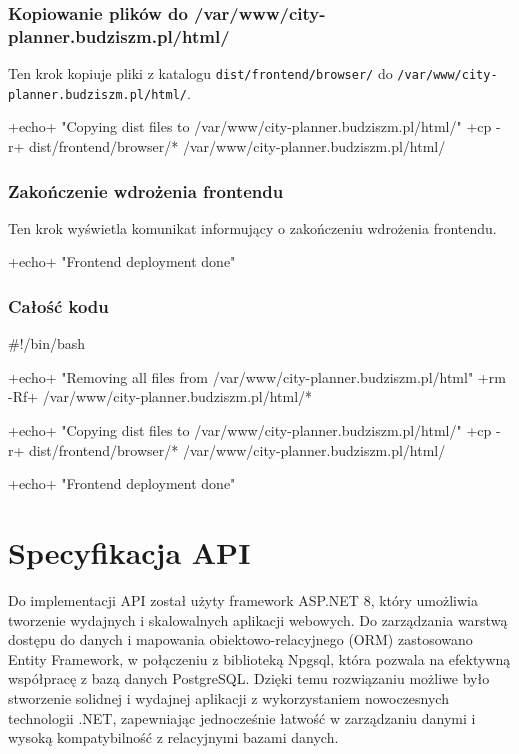 \subsubsection{Kopiowanie plików do /var/www/city-planner.budziszm.pl/html/}
Ten krok kopiuje pliki z katalogu \texttt{dist/frontend/browser/} \newline
do \texttt{/var/www/city-planner.budziszm.pl/html/}.
\begin{longlisting}[style=shell-colored]
+echo+ "Copying dist files to /var/www/city-planner.budziszm.pl/html/"
+cp -r+ dist/frontend/browser/* /var/www/city-planner.budziszm.pl/html/
\end{longlisting}

\subsubsection{Zakończenie wdrożenia frontendu}
Ten krok wyświetla komunikat informujący o zakończeniu wdrożenia frontendu.
\begin{longlisting}[style=shell-colored]
+echo+ "Frontend deployment done"
\end{longlisting}

\subsubsection{Całość kodu}
\begin{longlisting}[style=shell-colored]
#!/bin/bash

+echo+ "Removing all files from /var/www/city-planner.budziszm.pl/html"
+rm -Rf+ /var/www/city-planner.budziszm.pl/html/*

+echo+ "Copying dist files to /var/www/city-planner.budziszm.pl/html/"
+cp -r+ dist/frontend/browser/* /var/www/city-planner.budziszm.pl/html/

+echo+ "Frontend deployment done"
\end{longlisting}

\section{Specyfikacja API}
Do implementacji API został użyty framework ASP.NET 8, który umożliwia tworzenie wydajnych i skalowalnych aplikacji webowych. Do zarządzania warstwą dostępu do danych i mapowania obiektowo-relacyjnego (ORM) zastosowano Entity Framework, w połączeniu z biblioteką Npgsql, która pozwala na efektywną współpracę z bazą danych PostgreSQL\@.
Dzięki temu rozwiązaniu możliwe było stworzenie solidnej i wydajnej aplikacji z wykorzystaniem nowoczesnych technologii .NET, zapewniając jednocześnie łatwość w zarządzaniu danymi i wysoką kompatybilność z relacyjnymi bazami danych.

